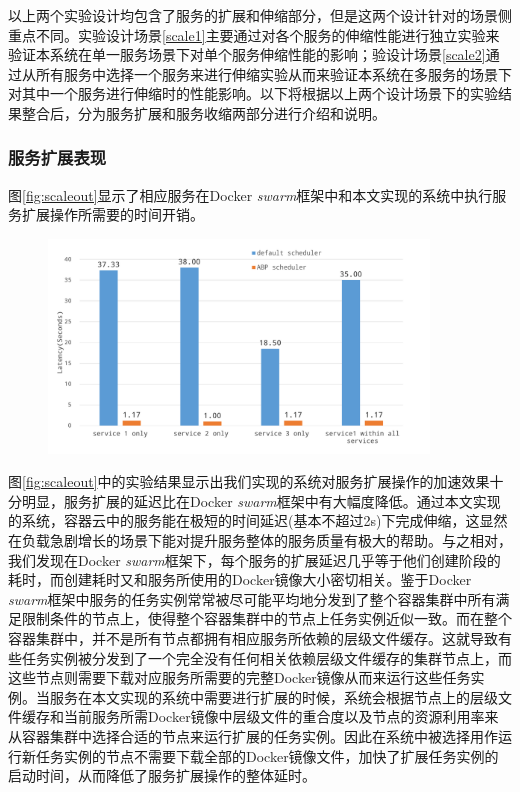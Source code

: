 以上两个实验设计均包含了服务的扩展和伸缩部分，但是这两个设计针对的场景侧重点不同。实验设计场景\ref{scale1}主要通过对各个服务的伸缩性能进行独立实验来验证本系统在单一服务场景下对单个服务伸缩性能的影响；验设计场景\ref{scale2}通过从所有服务中选择一个服务来进行伸缩实验从而来验证本系统在多服务的场景下对其中一个服务进行伸缩时的性能影响。以下将根据以上两个设计场景下的实验结果整合后，分为服务扩展和服务收缩两部分进行介绍和说明。

\subsubsection{服务扩展表现}
图\ref{fig:scaleout}显示了相应服务在Docker \emph{swarm}框架中和本文实现的系统中执行服务扩展操作所需要的时间开销。
\begin{figure}[H]
\centering
\includegraphics[width=0.9\textwidth]{./figure/scaleout}
\end{figure}

图\ref{fig:scaleout}中的实验结果显示出我们实现的系统对服务扩展操作的加速效果十分明显，服务扩展的延迟比在Docker \emph{swarm}框架中有大幅度降低。通过本文实现的系统，容器云中的服务能在极短的时间延迟(基本不超过2s)下完成伸缩，这显然在负载急剧增长的场景下能对提升服务整体的服务质量有极大的帮助。与之相对，我们发现在Docker \emph{swarm}框架下，每个服务的扩展延迟几乎等于他们创建阶段的耗时，而创建耗时又和服务所使用的Docker镜像大小密切相关。鉴于Docker \emph{swarm}框架中服务的任务实例常常被尽可能平均地分发到了整个容器集群中所有满足限制条件的节点上，使得整个容器集群中的节点上任务实例近似一致。而在整个容器集群中，并不是所有节点都拥有相应服务所依赖的层级文件缓存。这就导致有些任务实例被分发到了一个完全没有任何相关依赖层级文件缓存的集群节点上，而这些节点则需要下载对应服务所需要的完整Docker镜像从而来运行这些任务实例。当服务在本文实现的系统中需要进行扩展的时候，系统会根据节点上的层级文件缓存和当前服务所需Docker镜像中层级文件的重合度以及节点的资源利用率来从容器集群中选择合适的节点来运行扩展的任务实例。因此在系统中被选择用作运行新任务实例的节点不需要下载全部的Docker镜像文件，加快了扩展任务实例的启动时间，从而降低了服务扩展操作的整体延时。

